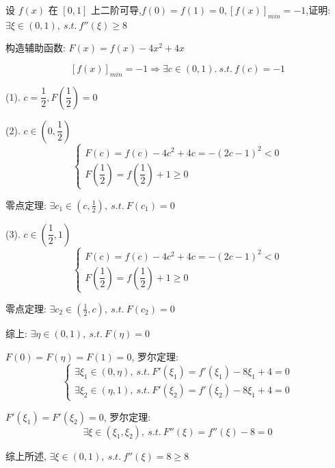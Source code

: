\begin{proposition}
	设 $f(x)$ 在 $[0,1]$ 上二阶可导,$f(0)=f(1)=0,[f(x)]_{min}=-1$,证明: $\exists \xi\in(0,1),\ s.t.\ f''(\xi)\geq 8$
\end{proposition}
\begin{solution}

	构造辅助函数: $F(x)=f(x)-4x^2+4x$

	$$[f(x)]_{min}=-1\Rightarrow \exists c\in(0,1).\ s.t.\ f(c)=-1$$

	(1). $c=\dfrac{1}{2}, F(\dfrac{1}{2})=0$
	

	(2). $c\in(0,\dfrac{1}{2})$
	$$\begin{cases}
		F(c) = f(c)-4c^2+4c = -(2c-1)^2<0 \\
		F(\dfrac{1}{2}) = f(\dfrac{1}{2})+1\geq 0
	\end{cases}$$

	零点定理: $\exists c_{1}\in(c,\frac{1}{2}),\ s.t.\ F(c_{1})=0$


	(3). $c\in(\dfrac{1}{2},1)$
	$$\begin{cases}
		F(c) = f(c)-4c^2+4c = -(2c-1)^2<0 \\
		F(\dfrac{1}{2}) = f(\dfrac{1}{2})+1\geq 0
	\end{cases}$$

	零点定理: $\exists c_{2}\in(\frac{1}{2},c),\ s.t.\ F(c_{2})=0$

	综上: $\exists \eta\in(0,1),\ s.t.\ F(\eta)=0$

	$F(0) = F(\eta) = F(1) =0$, 罗尔定理:
	$$\begin{cases}
		\exists \xi_{1}\in(0,\eta),\ s.t.\ F'(\xi_{1})=f'(\xi_{1})-8\xi_{1}+4=0 \\
		\exists \xi_{2}\in(\eta,1),\ s.t.\ F'(\xi_{2})=f'(\xi_{2})-8\xi_{1}+4=0
	\end{cases}$$

	$F'(\xi_{1}) = F'(\xi_{2}) = 0$, 罗尔定理:
	$$\exists \xi\in(\xi_{1},\xi_{2}),\ s.t.\ F''(\xi)=f''(\xi)-8=0$$

	综上所述, $\exists \xi\in(0,1),\ s.t.\ f''(\xi)=8\geq 8$
\end{solution}
